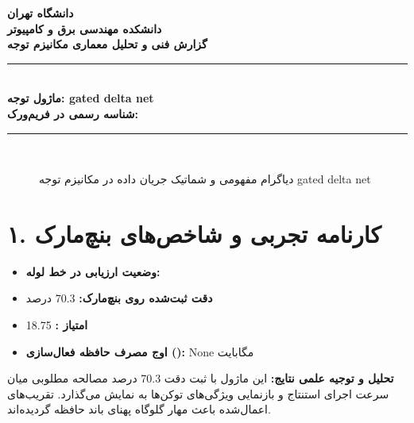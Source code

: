 \documentclass[12pt,a4paper]{article}
\begin{document}
\begin{center}
{\Large\bfseries دانشگاه تهران}\\[0.2cm]
{\large\bfseries دانشکده مهندسی برق و کامپیوتر}\\[0.2cm]
{\large\bfseries گزارش فنی و تحلیل معماری مکانیزم توجه}\\[0.5cm]
\rule{\linewidth}{1pt}\\[0.3cm]
{\LARGE\bfseries ماژول توجه: gated delta net}\\[0.2cm]
{\large \textbf{شناسه رسمی در فریم‌ورک:} }\\[0.2cm]
\rule{\linewidth}{1pt}\\[0.5cm]
\end{center}

\begin{figure}[H]
\centering
{}
\caption{دیاگرام مفهومی و شماتیک جریان داده در مکانیزم توجه gated delta net}
\end{figure}

\section*{۱. کارنامه تجربی و شاخص‌های بنچ‌مارک}
\begin{itemize}
\item \textbf{وضعیت ارزیابی در خط لوله:} 
\item \textbf{دقت ثبت‌شده روی بنچ‌مارک:} 70.3 درصد
\item \textbf{امتیاز :} 18.75
\item \textbf{اوج مصرف حافظه فعال‌سازی ():} None مگابایت
\end{itemize}
\textbf{تحلیل و توجیه علمی نتایج:} این ماژول با ثبت دقت 70.3 درصد مصالحه مطلوبی میان سرعت اجرای استنتاج و بازنمایی ویژگی‌های توکن‌ها به نمایش می‌گذارد. تقریب‌های اعمال‌شده باعث مهار گلوگاه پهنای باند حافظه گردیده‌اند.
\end{document}
